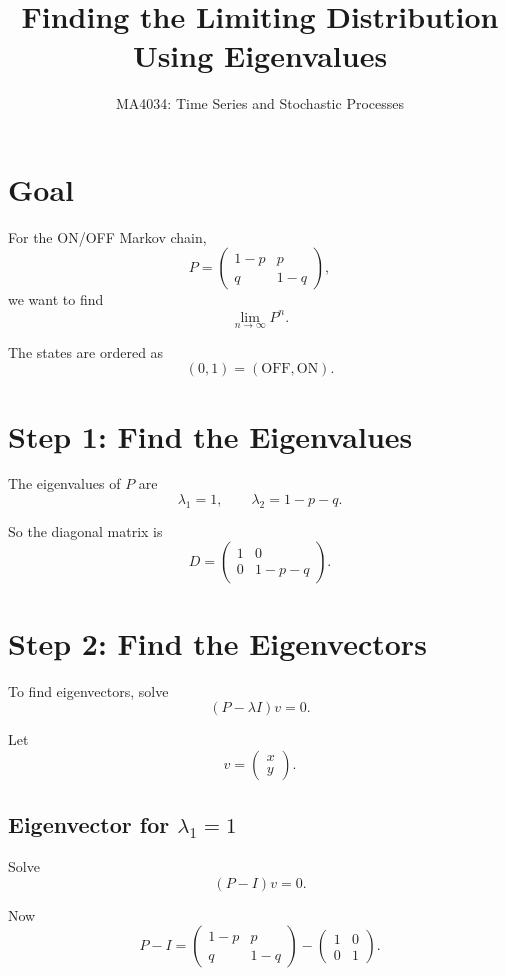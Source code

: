 \documentclass[12pt,a4paper]{article}
\title{\textbf{Finding the Limiting Distribution Using Eigenvalues}}
\author{MA4034: Time Series and Stochastic Processes}
\date{}
\theoremstyle{notestyle}
\begin{document}
\maketitle

\section{Goal}

For the ON/OFF Markov chain,
\[
P=
\begin{pmatrix}
1-p & p\\
q & 1-q
\end{pmatrix},
\]
we want to find
\[
\lim_{n\to\infty}P^n.
\]

The states are ordered as
\[
(0,1)=(\text{OFF},\text{ON}).
\]

\section{Step 1: Find the Eigenvalues}

The eigenvalues of $P$ are
\[
\lambda_1=1,
\qquad
\lambda_2=1-p-q.
\]

So the diagonal matrix is
\[
D=
\begin{pmatrix}
1 & 0\\
0 & 1-p-q
\end{pmatrix}.
\]

\section{Step 2: Find the Eigenvectors}

To find eigenvectors, solve
\[
(P-\lambda I)v=0.
\]

Let
\[
v=
\begin{pmatrix}
x\\
y
\end{pmatrix}.
\]

\subsection{Eigenvector for $\lambda_1=1$}

Solve
\[
(P-I)v=0.
\]

Now
\[
P-I
=
\begin{pmatrix}
1-p & p\\
q & 1-q
\end{pmatrix}
-
\begin{pmatrix}
1 & 0\\
0 & 1
\end{pmatrix}.
\]
\end{document}
